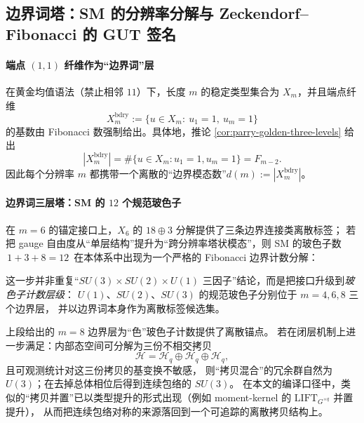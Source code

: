 \subsection{边界词塔：SM 的分辨率分解与 Zeckendorf--Fibonacci 的 GUT 签名}\label{subsec:bdry-tower-zeck-gut}

\paragraph{端点 \texorpdfstring{$(1,1)$}{(1,1)} 纤维作为“边界词”层}
在黄金均值语法（禁止相邻 \(11\)）下，长度 \(m\) 的稳定类型集合为 \(X_m\)，并且端点纤维
\[
X_m^{\mathrm{bdry}}
:=\{u\in X_m:\ u_1=1,\ u_m=1\}
\]
的基数由 Fibonacci 数强制给出。具体地，推论 \ref{cor:parry-golden-three-levels} 给出
\[
|X_m^{\mathrm{bdry}}|
=\#\{u\in X_m:u_1=1,u_m=1\}
=F_{m-2}.
\]
因此每个分辨率 \(m\) 都携带一个离散的“边界模态数”\(d(m):=|X_m^{\mathrm{bdry}}|\)。

\paragraph{边界词三层塔：SM 的 \(12\) 个规范玻色子}
在 \(m=6\) 的锚定接口上，\(X_6\) 的 \(18\oplus 3\) 分解提供了三条边界连接类离散标签；
若把 gauge 自由度从“单层结构”提升为“跨分辨率塔状模态”，则 SM 的玻色子数
\(\,1+3+8=12\,\)
在本体系中出现为一个严格的 Fibonacci 边界计数分解：

这一步并非重复“\(SU(3)\times SU(2)\times U(1)\) 三因子”结论，而是把接口升级到\emph{玻色子计数层级}：
\(U(1)\)、\(SU(2)\)、\(SU(3)\) 的规范玻色子分别位于 \(m=4,6,8\) 三个边界层，
并以边界词本身作为离散标签候选集。

\begin{remark}\label{rem:color-as-three-copy-envelope}
上段给出的 \(m=8\) 边界层为“色”玻色子计数提供了离散锚点。
若在闭层机制上进一步满足：内部态空间可分解为三份不相交拷贝
\[
\mathcal{H}=\mathcal{H}_q\oplus\mathcal{H}_q\oplus\mathcal{H}_q,
\]
且可观测统计对这三份拷贝的基变换不敏感，
则“拷贝混合”的冗余群自然为 \(U(3)\)；在去掉总体相位后得到连续包络的 \(SU(3)\)。
在本文的编译口径中，类似的“拷贝并置”已以类型提升的形式出现（例如 moment-kernel 的 \(\mathrm{LIFT}_{G^{\times q}}\) 并置提升），
从而把连续包络对称的来源落回到一个可追踪的离散拷贝结构上。
\end{remark}

